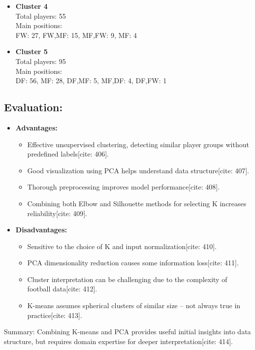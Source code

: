 \documentclass[12pt]{report}
\begin{document}
{{{\begin{itemize}
  \item \textbf{Cluster 4} \\
  Total players: 55 \\
  Main positions: \\
  \quad FW: 27, FW,MF: 15, MF,FW: 9, MF: 4

  \item \textbf{Cluster 5} \\
  Total players: 95 \\
  Main positions: \\
  \quad DF: 56, MF: 28, DF,MF: 5, MF,DF: 4, DF,FW: 1
 \end{itemize}
\subsection{Evaluation:}
\begin{itemize}
  \item \textbf{Advantages:}
  \begin{itemize}
    \item Effective unsupervised clustering, detecting similar player groups without predefined labels[cite: 406].
    \item Good visualization using PCA helps understand data structure[cite: 407].
    \item Thorough preprocessing improves model performance[cite: 408].
    \item Combining both Elbow and Silhouette methods for selecting K increases reliability[cite: 409].
  \end{itemize}
  \item \textbf{Disadvantages:}
  \begin{itemize}
    \item Sensitive to the choice of K and input normalization[cite: 410].
    \item PCA dimensionality reduction causes some information loss[cite: 411].
    \item Cluster interpretation can be challenging due to the complexity of football data[cite: 412].
    \item K-means assumes spherical clusters of similar size – not always true in practice[cite: 413].
  \end{itemize}
\end{itemize}

Summary: Combining K-means and PCA provides useful initial insights into data structure, but requires domain expertise for deeper interpretation[cite: 414].
}

}}
\end{document}
